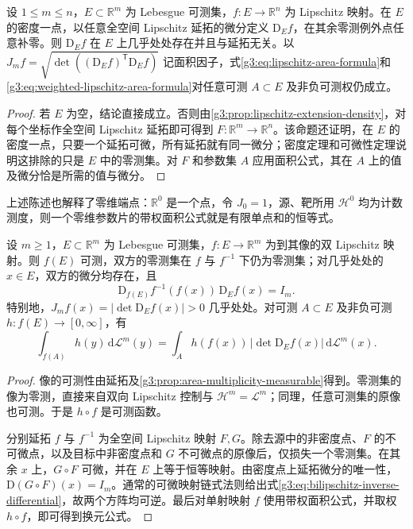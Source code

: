 \begin{corollary}\label{g3:cor:area-formula-subsets}
	设 \(1\le m\le n\)，\(E\subset\mathbb R^m\) 为 Lebesgue 可测集，\(f:E\to\mathbb R^n\) 为 Lipschitz 映射。在 \(E\) 的密度一点，以任意全空间 Lipschitz 延拓的微分定义 \(\mathrm D_Ef\)，在其余零测例外点任意补零。则 \(\mathrm D_Ef\) 在 \(E\) 上几乎处处存在并且与延拓无关。以 \(J_mf=\sqrt{\det((\mathrm D_Ef)^{\mathsf T}\mathrm D_Ef)}\) 记面积因子，式\eqref{g3:eq:lipschitz-area-formula}和\eqref{g3:eq:weighted-lipschitz-area-formula}对任意可测 \(A\subset E\) 及非负可测权仍成立。
\end{corollary}
\begin{proof}
	若 \(E\) 为空，结论直接成立。否则由\cref{g3:prop:lipschitz-extension-density}，对每个坐标作全空间 Lipschitz 延拓即可得到 \(F:\mathbb R^m\to\mathbb R^n\)。该命题还证明，在 \(E\) 的密度一点，只要一个延拓可微，所有延拓就有同一微分；密度定理和可微性定理说明这排除的只是 \(E\) 中的零测集。对 \(F\) 和参数集 \(A\) 应用面积公式，其在 \(A\) 上的值及微分恰是所需的值与微分。
\end{proof}

上述陈述也解释了零维端点：\(\mathbb R^0\) 是一个点，令 \(J_0=1\)，源、靶所用 \(\mathcal H^0\) 均为计数测度，则一个零维参数片的带权面积公式就是有限单点和的恒等式。

\begin{corollary}\label{g3:cor:bilipschitz-change-variables}
	设 \(m\ge1\)，\(E\subset\mathbb R^m\) 为 Lebesgue 可测集，\(f:E\to\mathbb R^m\) 为到其像的双 Lipschitz 映射。则 \(f(E)\) 可测，双方的零测集在 \(f\) 与 \(f^{-1}\) 下仍为零测集；对几乎处处的 \(x\in E\)，双方的微分均存在，且
	\begin{equation}\label{g3:eq:bilipschitz-inverse-differential}
		\mathrm D_{f(E)}f^{-1}(f(x))\,\mathrm D_Ef(x)=I_m.
	\end{equation}
	特别地，\(J_mf(x)=|\det\mathrm D_Ef(x)|>0\) 几乎处处。对可测 \(A\subset E\) 及非负可测 \(h:f(E)\to[0,\infty]\)，有
	\begin{equation}\label{g3:eq:bilipschitz-change-variables}
		\int_{f(A)}h(y)\,\mathrm d\mathcal L^m(y)
		=\int_Ah(f(x))\,|\det\mathrm D_Ef(x)|\,\mathrm d\mathcal L^m(x).
	\end{equation}
\end{corollary}
\begin{proof}
	像的可测性由延拓及\cref{g3:prop:area-multiplicity-measurable}得到。零测集的像为零测，直接来自双向 Lipschitz 控制与 \(\mathcal H^m=\mathcal L^m\)；同理，任意可测集的原像也可测。于是 \(h\circ f\) 是可测函数。

	分别延拓 \(f\) 与 \(f^{-1}\) 为全空间 Lipschitz 映射 \(F,G\)。除去源中的非密度点、\(F\) 的不可微点，以及目标中非密度点和 \(G\) 不可微点的原像后，仅损失一个零测集。在其余 \(x\) 上，\(G\circ F\) 可微，并在 \(E\) 上等于恒等映射。由密度点上延拓微分的唯一性，\(\mathrm D(G\circ F)(x)=I_m\)。通常的可微映射链式法则给出式\eqref{g3:eq:bilipschitz-inverse-differential}，故两个方阵均可逆。最后对单射映射 \(f\) 使用带权面积公式，并取权 \(h\circ f\)，即可得到换元公式。
\end{proof}

